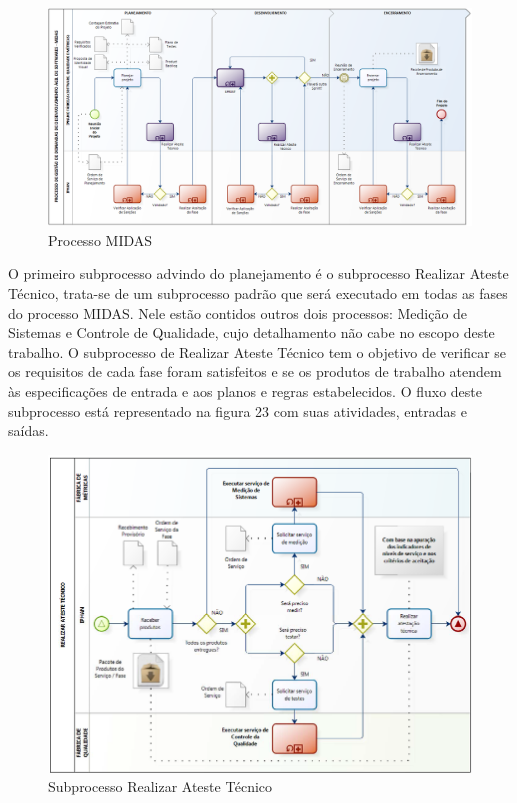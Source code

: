 \begin{anexosenv}
\begin{figure}[H]
		\centering
		\label{fig01}
			\includegraphics[scale=0.3]{figuras/processoMIDAS.png}
		\caption{Processo MIDAS \cite{IPHAN:2013}}
\end{figure}

O primeiro subprocesso advindo do planejamento é o subprocesso Realizar Ateste Técnico, trata-se de um subprocesso padrão que será executado em todas as fases do processo MIDAS. Nele estão contidos outros dois processos: Medição de Sistemas e Controle de Qualidade, cujo detalhamento não cabe no escopo deste trabalho. O subprocesso de Realizar Ateste Técnico tem o objetivo de verificar se os requisitos de cada fase foram satisfeitos e se os produtos de trabalho atendem às especificações de entrada e aos planos e regras estabelecidos. O fluxo deste subprocesso está representado na figura 23 com suas atividades, entradas e saídas.

\begin{figure}[H]
		\centering
		\label{fig01}
			\includegraphics[scale=0.7]{figuras/subprocessoAteste.png}
		\caption{Subprocesso Realizar Ateste Técnico \cite{IPHAN:2013}}
\end{figure}


\end{anexosenv}
